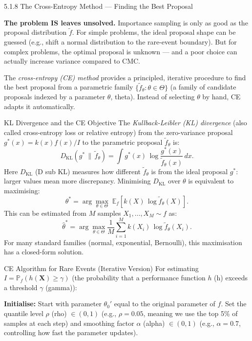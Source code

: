 \documentclass[aspectratio=169,10pt]{beamer}
\begin{document}
\begin{frame}[allowframebreaks]{5.1.8 The Cross-Entropy Method --- Finding the Best Proposal}

\textbf{The problem IS leaves unsolved.}
Importance sampling is only as good as the proposal distribution $\tilde{f}$.
For simple problems, the ideal proposal shape can be guessed (e.g., shift a
normal distribution to the rare-event boundary).  But for complex problems,
the optimal proposal is unknown --- and a poor choice can actually increase
variance compared to CMC.

The \emph{cross-entropy (CE) method} provides a principled, iterative
procedure to find the best proposal from a parametric family
$\{\tilde{f}_\theta : \theta \in \Theta\}$ (a family of candidate proposals
indexed by a parameter $\theta$, theta).  Instead of selecting $\theta$ by
hand, CE adapts it automatically.

\begin{block}{KL Divergence and the CE Objective}
  The \emph{Kullback-Leibler (KL) divergence} (also called cross-entropy loss
  or relative entropy) from the zero-variance proposal $g^*(x) = k(x)f(x)/I$
  to the parametric proposal $\tilde{f}_\theta$ is:
  \[
    D_{\mathrm{KL}}(g^* \,\|\, \tilde{f}_\theta)
    = \int g^*(x)\,\log\frac{g^*(x)}{\tilde{f}_\theta(x)}\,dx.
  \]
  Here $D_{\mathrm{KL}}$ (D sub KL) measures how different $\tilde{f}_\theta$ is
  from the ideal proposal $g^*$: larger values mean more discrepancy.
  Minimising $D_{\mathrm{KL}}$ over $\theta$ is equivalent to maximising:
  \[
    \theta^* = \arg\max_{\theta \in \Theta}
    \;\mathbb{E}_f\!\left[k(X)\,\log \tilde{f}_\theta(X)\right].
  \]
  This can be estimated from $M$ samples $X_1, \ldots, X_M \sim f$ as:
  \[
    \hat{\theta}^*
    = \arg\max_{\theta \in \Theta}
    \frac{1}{M}\sum_{i=1}^M k(X_i)\,\log\tilde{f}_\theta(X_i).
  \]
  For many standard families (normal, exponential, Bernoulli), this
  maximisation has a closed-form solution.
\end{block}

\framebreak

\begin{block}{CE Algorithm for Rare Events (Iterative Version)}
  For estimating $I = \mathbb{P}_f(h(\mathbf{X}) \ge \gamma)$ (the probability
  that a performance function $h$ (h) exceeds a threshold $\gamma$ (gamma)):

  \textbf{Initialise:} Start with parameter $\theta_0'$ equal to the
  original parameter of $f$.  Set the quantile level $\rho$ (rho) $\in (0,1)$
  (e.g., $\rho = 0.05$, meaning we use the top 5\% of samples at each step)
  and smoothing factor $\alpha$ (alpha) $\in (0,1)$ (e.g., $\alpha = 0.7$,
  controlling how fast the parameter updates).


\end{block}
\end{frame}
\end{document}

